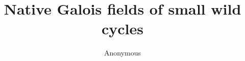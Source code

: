\documentclass[11pt]{article}
\title{Native Galois fields of small wild cycles}
\author{Anonymous}
\date{}
\begin{document}
\maketitle
\begin{abstract}

\end{abstract}










\end{document}
